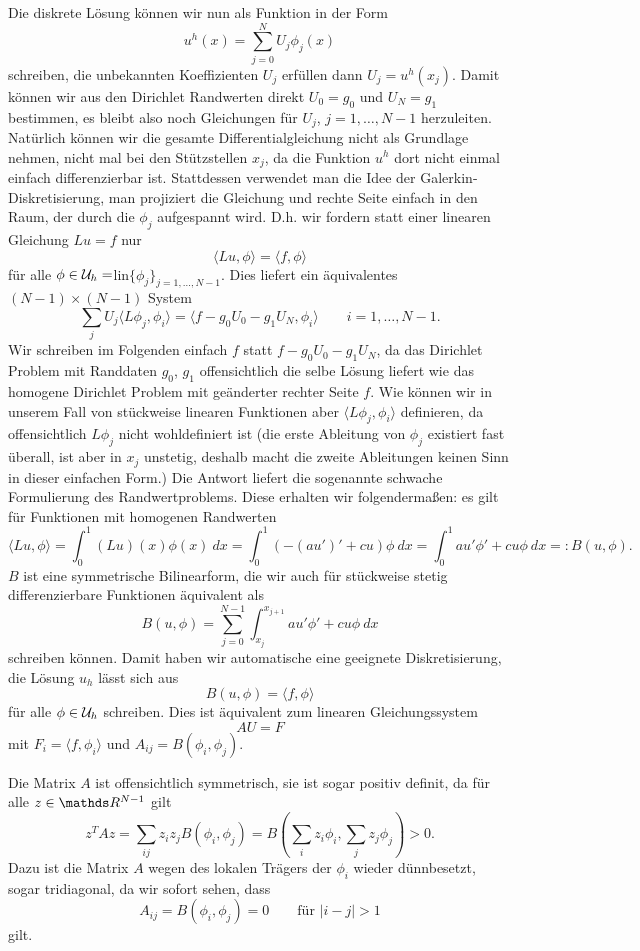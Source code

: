 Die diskrete L\"osung können wir nun als Funktion in der Form
$$ u^h(x) = \sum_{j=0}^N U_j \phi_j(x) $$
schreiben, die unbekannten Koeffizienten $U_j$ erf\"ullen dann $U_j=u^h(x_j)$. Damit k\"onnen wir aus den Dirichlet Randwerten direkt $U_0=g_0$ und $U_N = g_1$ bestimmen, es bleibt also noch Gleichungen f\"ur $U_j$, $j=1,\ldots,N-1$ herzuleiten. Nat\"urlich k\"onnen wir die gesamte Differentialgleichung nicht als Grundlage nehmen, nicht mal bei den St\"utzstellen $x_j$, da die Funktion $u^h$ dort nicht einmal einfach differenzierbar ist. Stattdessen verwendet man die Idee der Galerkin-Diskretisierung, man projiziert die Gleichung und rechte Seite einfach in den Raum, der durch die $\phi_j$ aufgespannt wird. D.h. wir fordern statt einer linearen Gleichung $Lu = f$ nur 
$$ \langle Lu, \phi \rangle = \langle f, \phi \rangle $$
f\"ur alle $\phi \in {\cal U}_h = $lin$\{\phi_j\}_{j=1,\ldots,N-1}$. Dies liefert ein \"aquivalentes $(N-1) \times (N-1)$ System
$$ \sum_j U_j \langle L \phi_j, \phi_i \rangle = \langle f - g_0 U_0 - g_1 U_N, \phi_i \rangle \qquad i=1,\ldots,N-1. $$
Wir schreiben im Folgenden einfach $f$ statt $f - g_0 U_0 - g_1 U_N$, da das Dirichlet Problem mit Randdaten $g_0$, $g_1$ offensichtlich die selbe L\"osung liefert wie das homogene Dirichlet Problem mit ge\"anderter rechter Seite $f$. Wie k\"onnen wir in unserem Fall von st\"uckweise linearen Funktionen aber $\langle L\phi_j, \phi_i \rangle$ definieren, da offensichtlich $L\phi_j$ nicht wohldefiniert ist (die erste Ableitung von $\phi_j$ existiert fast \"uberall, ist aber in $x_j$ unstetig, deshalb macht die zweite Ableitungen keinen Sinn in dieser einfachen Form.) Die Antwort liefert die sogenannte schwache Formulierung des Randwertproblems. Diese erhalten wir folgendermaßen: es gilt für Funktionen mit homogenen Randwerten
$$ \langle L u, \phi \rangle = \int_0^1 (Lu)(x)\phi(x)~dx = \int_0^1 (-(au')'+cu)\phi~dx = \int_0^1 a u' \phi' + cu \phi~dx =:B(u,\phi) .$$ 
$B$ ist eine symmetrische Bilinearform, die wir auch f\"ur st\"uckweise stetig differenzierbare Funktionen \"aquivalent als
$$ B(u,\phi) = \sum_{j=0}^{N-1} \int_{x_j}^{x_{j+1}} a u' \phi' + cu \phi~dx  $$ 
schreiben k\"onnen. Damit haben wir automatische eine geeignete Diskretisierung, die L\"osung $u_h$ l\"asst sich aus
$$ B(u,\phi) = \langle f, \phi \rangle $$
f\"ur alle $\phi \in {\cal U}_h$ schreiben. Dies ist \"aquivalent zum linearen Gleichungssystem 
$$ A U = F$$ 
mit $F_i =  \langle f, \phi_i \rangle$ und $A_{ij} = B(\phi_i,\phi_j)$.

Die Matrix $A$ ist offensichtlich symmetrisch, sie ist sogar positiv definit, da f\"ur alle $z \in \R^{N-1}$ gilt
$$ z^T A z = \sum_{ij} z_i z_j B(\phi_i,\phi_j) = B(\sum_i z_i \phi_i, \sum_j z_j \phi_j) > 0. $$
Dazu ist die Matrix $A$ wegen des lokalen Tr\"agers der $\phi_i$ wieder d\"unnbesetzt, sogar tridiagonal, da wir sofort sehen, dass
$$ A_{ij} = B(\phi_i,\phi_j) = 0 \qquad \text{f\"ur } \vert i - j \vert > 1$$
gilt. 

